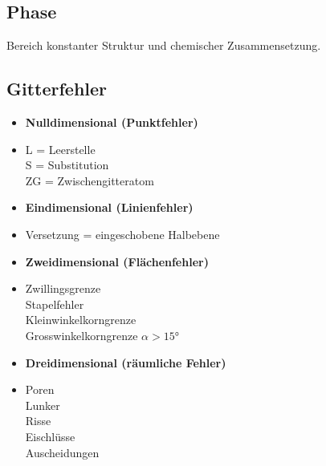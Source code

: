 \documentclass[8.5pt,twocolumn]{extarticle}
\begin{document}
    \subsection{Phase} Bereich konstanter Struktur und chemischer
    Zusammensetzung.
    \subsection{Gitterfehler}
     \begin{minipage}[t]{0.5\columnwidth}
        \begin{itemize}[label={}, leftmargin=*, itemsep=0.01em]
            \item \textbf{Nulldimensional (Punktfehler)}
            \item L = Leerstelle \\ S = Substitution \\  ZG = Zwischengitteratom
        \end{itemize}
    \end{minipage}\hfill
    \begin{minipage}[t]{0.5\columnwidth}
        \begin{itemize}[label={}, leftmargin=*,  itemsep=0.01em]
            \item \textbf{Eindimensional (Linienfehler)}
            \item Versetzung = eingeschobene Halbebene
        \end{itemize}
    \end{minipage}\hfill
    \begin{minipage}[t]{0.5\columnwidth}
        \begin{itemize}[label={}, leftmargin=*, itemsep=0.01em]
            \item \textbf{Zweidimensional (Flächenfehler)}
            \item Zwillingsgrenze \\ Stapelfehler \\ Kleinwinkelkorngrenze \\ Grosswinkelkorngrenze $\alpha>15°$
        \end{itemize}
    \end{minipage}\hfill
    \begin{minipage}[t]{0.5\columnwidth}
        \begin{itemize}[label={}, leftmargin=*,  itemsep=0.01em]
            \item \textbf{Dreidimensional (räumliche Fehler)}
            \item Poren \\ Lunker \\ Risse \\ Eischlüsse \\ Auscheidungen 
        \end{itemize}
    \end{minipage}\hfill
\end{document}
